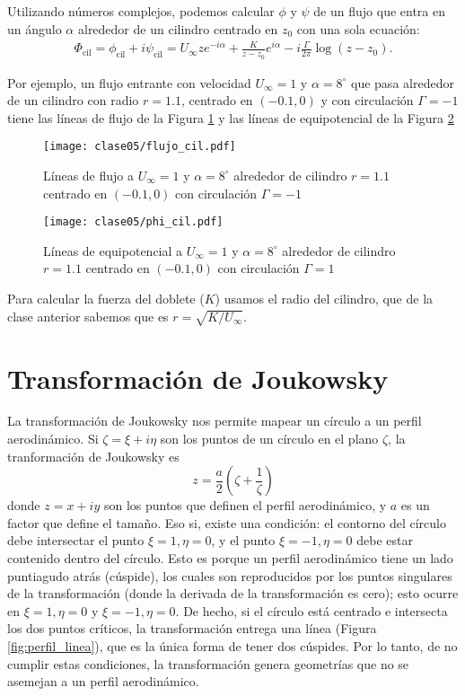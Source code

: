 Utilizando números complejos, podemos calcular $\phi$ y $\psi$ de un flujo que entra en un ángulo $\alpha$ alrededor de un cilindro centrado en $z_0$ con una sola ecuación:
%
\begin{align} \label{eq:cilindro}
\Phi_\text{cil} = \phi_\text{cil}+i\psi_\text{cil} = U_\infty z e^{-i\alpha} + \frac{K}{z-z_0}e^{i\alpha} -i\frac{\Gamma}{2\pi} \log(z-z_0).
\end{align}

Por ejemplo, un flujo entrante con velocidad $U_\infty=1$ y $\alpha=8^\circ$ que pasa alrededor de un cilindro con radio $r=1.1$, centrado en $(-0.1,0)$ y con circulación $\Gamma=-1$ tiene las líneas de flujo de la Figura \ref{fig:flujo_cil} y las líneas de equipotencial de la Figura \ref{fig:phi_cil}
%
\begin{figure}[h!]
\centering
\texttt{[image: clase05/flujo\_cil.pdf]}
\caption{Líneas de flujo a $U_\infty=1$ y $\alpha=8^\circ$ alrededor de cilindro $r=1.1$ centrado en $(-0.1,0)$ con circulación $\Gamma=-1$}\label{fig:flujo_cil}
\end{figure}
%
\begin{figure}[h!]
\centering
\texttt{[image: clase05/phi\_cil.pdf]}
\caption{Líneas de equipotencial a $U_\infty=1$ y $\alpha=8^\circ$ alrededor de cilindro $r=1.1$ centrado en $(-0.1,0)$ con circulación $\Gamma=1$}\label{fig:phi_cil}
\end{figure}

Para calcular la fuerza del doblete ($K$) usamos el radio del cilindro, que de la clase anterior sabemos que es $r=\sqrt{K/U_\infty}$.

\section*{Transformación de Joukowsky}

La transformación de Joukowsky nos permite mapear un círculo a un perfil aerodinámico. 
Si $\zeta = \xi + i\eta$ son los puntos de un círculo en el plano $\zeta$, la tranformación de Joukowsky es
%
\begin{equation}
z = \frac{a}{2}\left(\zeta + \frac{1}{\zeta}\right)
\end{equation}
%
donde $z=x+iy$ son los puntos que definen el perfil aerodinámico, y $a$ es un factor que define el tamaño. 
Eso si, existe una condición: el contorno del círculo debe intersectar el punto $\xi=1, \eta=0$, y el punto $\xi=-1, \eta=0$ debe estar contenido dentro del círculo. 
Esto es porque un perfil aerodinámico tiene un lado puntiagudo atrás (cúspide), los cuales son reproducidos por los puntos singulares de la transformación (donde la derivada de la transformación es cero); esto ocurre en $\xi=1, \eta=0$ y $\xi=-1, \eta=0$.
De hecho, si el círculo está centrado e intersecta los dos puntos críticos, la transformación entrega una línea (Figura \ref{fig:perfil_linea}), que es la única forma de tener dos cúspides.
Por lo tanto, de no cumplir estas condiciones, la transformación genera geometrías que no se asemejan a un perfil aerodinámico.

